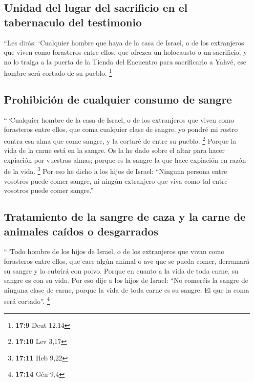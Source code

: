 \begin{paracol}{2}
{\subsection{Unidad del lugar del sacrificio en el tabernaculo del
testimonio}\label{unidad-del-lugar-del-sacrificio-en-el-tabernaculo-del-testimonio}}

 ``Les dirás: `Cualquier hombre que haya de la casa de
Israel, o de los extranjeros que viven como forasteros entre ellos, que
ofrezca un holocausto o un sacrificio,  y no lo traiga a
la puerta de la Tienda del Encuentro para sacrificarlo a Yahvé, ese
hombre será cortado de su pueblo. \footnote{\textbf{17:9} Deut 12,14}

\hypertarget{prohibiciuxf3n-de-cualquier-consumo-de-sangre}{%
\subsection{Prohibición de cualquier consumo de
sangre}\label{prohibiciuxf3n-de-cualquier-consumo-de-sangre}}

 ``\,`Cualquier hombre de la casa de Israel, o de los
extranjeros que viven como forasteros entre ellos, que coma cualquier
clase de sangre, yo pondré mi rostro contra esa alma que come sangre, y
la cortaré de entre su pueblo. \footnote{\textbf{17:10} Lev 3,17}
 Porque la vida de la carne está en la sangre. Os la he
dado sobre el altar para hacer expiación por vuestras almas; porque es
la sangre la que hace expiación en razón de la vida. \footnote{\textbf{17:11}
  Heb 9,22}  Por eso he dicho a los hijos de Israel:
``Ninguna persona entre vosotros puede comer sangre, ni ningún
extranjero que viva como tal entre vosotros puede comer sangre.''

\hypertarget{tratamiento-de-la-sangre-de-caza-y-la-carne-de-animales-cauxeddos-o-desgarrados}{%
\subsection{Tratamiento de la sangre de caza y la carne de animales
caídos o
desgarrados}\label{tratamiento-de-la-sangre-de-caza-y-la-carne-de-animales-cauxeddos-o-desgarrados}}

 ``\,`Todo hombre de los hijos de Israel, o de los
extranjeros que vivan como forasteros entre ellos, que cace algún animal
o ave que se pueda comer, derramará su sangre y lo cubrirá con polvo.
 Porque en cuanto a la vida de toda carne, su sangre es
con su vida. Por eso dije a los hijos de Israel: ``No comeréis la sangre
de ninguna clase de carne, porque la vida de toda carne es su sangre. El
que la coma será cortado''. \footnote{\textbf{17:14} Gén 9,4}


\end{paracol}
